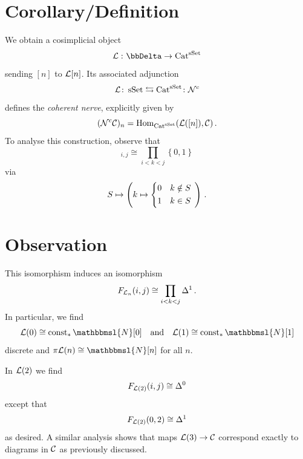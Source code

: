     \section{Corollary/Definition}
        We obtain a cosimplicial object
        \begin{equation*}
            \Ll \,\colon \bbDelta \to \Cat^{\sSet}
        \end{equation*}
        sending $[n]$ to $\mathcal{L}{[n]}$. Its associated adjunction
        \begin{equation*}
            \mathcal{L} \colon \operatorname{sSet} \leftrightarrows \operatorname{Cat}^{\operatorname{sSet}} \colon \mathcal{N}^c
        \end{equation*}
        defines the \emph{coherent nerve}, explicitly given by
        \begin{equation*}
            (\mathcal{N}^c \mathcal{C})_n = \operatorname{Hom}_{\operatorname{Cat}^{\operatorname{sSet}}}(\mathcal{L}([n]), \mathcal{C}) \,.
        \end{equation*}
        To analyse this construction, observe that
        \begin{equation*}
            [n]_{i,j} \cong \prod_{i < k < j}\left\{0, 1\right\}
        \end{equation*}
        via
        \begin{equation*}
            S \mapsto \left( 
                k \mapsto
                \begin{cases*}
                    0 & $k \notin S$ \\
                    1 & $k \in S$
                \end{cases*}
            \right) \,.
        \end{equation*}
        
    \section{Observation}\label{chIV-30}
        This isomorphism induces an isomorphism
        \begin{equation*}
            F_{\mathcal{L}_{n}}(i, j) \cong \prod_{i < k < j} \Delta^1 \,.
        \end{equation*}
        In particular, we find
        \begin{equation*}
            \Ll(0) \cong \const_{*}\mathbbmsl{N}[0] \quad \text{and} \quad \Ll(1) \cong \const_{*}\mathbbmsl{N}[1]
        \end{equation*}
        discrete and $\pi \Ll(n) \cong \mathbbmsl{N}[n]$ for all $n$.
        \medskip

        In $\mathcal{L}(2)$ we find
        \begin{equation*}
            F_{\mathcal{L}(2)}(i, j) \cong \Delta^0
        \end{equation*}
        except that
        \begin{equation*}
            F_{\mathcal{L}(2)}(0, 2) \cong \Delta^1
        \end{equation*}
        as desired. A similar analysis shows that maps $\mathcal{L}(3) \to \mathcal{C}$ correspond exactly to diagrams in $\mathcal{C}$ as previously discussed.

